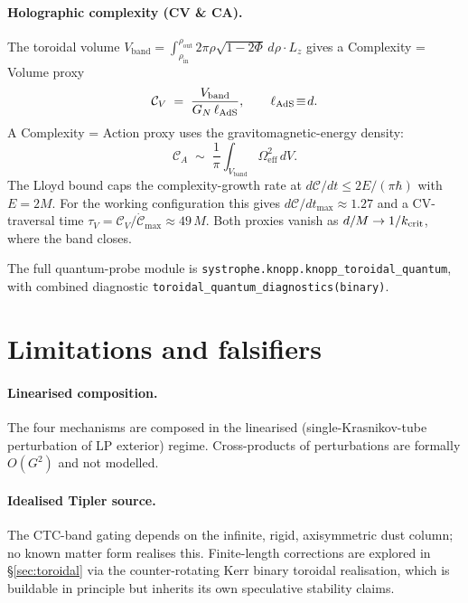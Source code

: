 \documentclass[11pt,a4paper]{article}
\begin{document}
\paragraph{Holographic complexity (CV \& CA).} The toroidal volume $V_{\mathrm{band}}\!=\!\int_{\rho_{\mathrm{in}}}^{\rho_{\mathrm{out}}}\!2\pi\rho\sqrt{1-2\Phi}\,d\rho\cdot L_{z}$ gives a Complexity = Volume proxy
\begin{equation}
\mathcal{C}_{V}\;=\;\frac{V_{\mathrm{band}}}{G_{N}\,\ell_{\rm AdS}},\qquad \ell_{\rm AdS}\!\equiv\!d.
\end{equation}
A Complexity = Action proxy uses the gravitomagnetic-energy density:
\begin{equation}
\mathcal{C}_{A}\;\sim\;\frac{1}{\pi}\int_{V_{\mathrm{band}}}\Omega_{\mathrm{eff}}^{2}\,dV.
\end{equation}
The Lloyd bound caps the complexity-growth rate at $d\mathcal{C}/dt \le 2E/(\pi\hbar)$ with $E=2M$. For the working configuration this gives $d\mathcal{C}/dt_{\max}\approx 1.27$ and a CV-traversal time $\tau_{V}=\mathcal{C}_{V}/\dot{\mathcal{C}}_{\max}\approx 49\,M$. Both proxies vanish as $d/M\to 1/k_{\rm crit}$, where the band closes.

The full quantum-probe module is \texttt{systrophe.knopp.knopp\_toroidal\_quantum}, with combined diagnostic \texttt{toroidal\_quantum\_diagnostics(binary)}.

\section{Limitations and falsifiers}\label{sec:limits}

\paragraph{Linearised composition.} The four mechanisms are composed in the linearised (single-Krasnikov-tube perturbation of LP exterior) regime. Cross-products of perturbations are formally $O(G^{2})$ and not modelled.

\paragraph{Idealised Tipler source.} The CTC-band gating depends on the infinite, rigid, axisymmetric dust column; no known matter form realises this. Finite-length corrections are explored in \S\ref{sec:toroidal} via the counter-rotating Kerr binary toroidal realisation, which is buildable in principle but inherits its own speculative stability claims.
\end{document}
